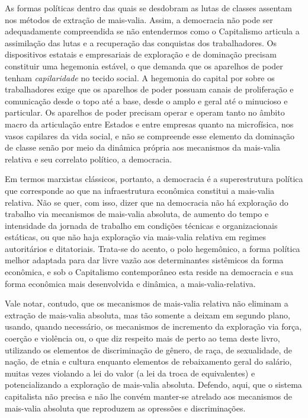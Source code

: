 As formas políticas dentro das quais se desdobram as lutas de classes
assentam nos métodos de extração de mais-valia. Assim, a democracia não
pode ser adequadamente compreendida se não entendermos como o
Capitalismo articula a assimilação das lutas e a recuperação das
conquistas dos trabalhadores. Os dispositivos estatais e empresariais de
exploração e de dominação precisam constituir uma hegemonia estável, o
que demanda que os aparelhos de poder tenham \emph{capilaridade} no
tecido social. A hegemonia do capital por sobre os trabalhadores exige
que os aparelhos de poder possuam canais de proliferação e comunicação
desde o topo até a base, desde o amplo e geral até o minucioso e
particular. Os aparelhos de poder precisam operar e operam tanto no
âmbito macro da articulação entre Estados e entre empresas quanto na
microfísica, nos vasos capilares da vida social, e não se compreende
esse elemento da dominação de classe senão por meio da dinâmica própria
aos mecanismos da mais-valia relativa e seu correlato político, a
democracia.

Em termos marxistas clássicos, portanto, a democracia é a superestrutura
política que corresponde ao que na infraestrutura econômica constitui a
mais-valia relativa. Não se quer, com isso, dizer que na democracia não
há exploração do trabalho via mecanismos de mais-valia absoluta, de
aumento do tempo e intensidade da jornada de trabalho em condições
técnicas e organizacionais estáticas, ou que não haja exploração via
mais-valia relativa em regimes autoritários e ditatoriais. Trata-se do
acento, o polo hegemônico, a forma política melhor adaptada para dar
livre vazão aos determinantes sistêmicos da forma econômica, e sob o
Capitalismo contemporâneo esta reside na democracia e sua forma
econômica mais desenvolvida e dinâmica, a mais-valia-relativa.

Vale notar, contudo, que os mecanismos de mais-valia relativa não
eliminam a extração de mais-valia absoluta, mas tão somente a deixam em
segundo plano, usando, quando necessário, os mecanismos de incremento da
exploração via força, coerção e violência ou, o que diz respeito mais de
perto ao tema deste livro, utilizando os elementos de discriminação de
gênero, de raça, de sexualidade, de nação, de etnia e cultura enquanto
elementos de rebaixamento geral do salário, muitas vezes violando a lei
do valor (a lei da troca de equivalentes) e potencializando a exploração
de mais-valia absoluta. Defendo, aqui, que o sistema capitalista não
precisa e não lhe convém manter-se atrelado aos mecanismos de mais-valia
absoluta que reproduzem as opressões e discriminações.

